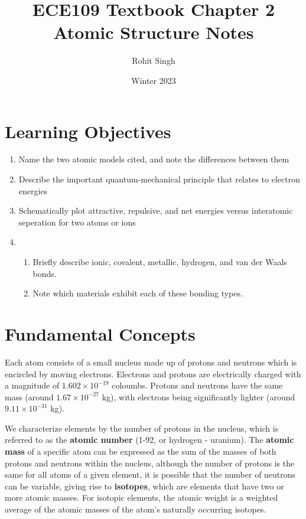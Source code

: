 \documentclass{article}
\title{ECE109 Textbook Chapter 2 Atomic Structure Notes}
\author{Rohit Singh}
\date{Winter 2023}
\begin{document}
\maketitle

\tableofcontents

\section{Learning Objectives}

\begin{enumerate}
    \item Name the two atomic models cited, and note the differences between them
    \item Describe the important quantum-mechanical principle that relates to electron energies
    \item Schematically plot attractive, repulsive, and net energies versus interatomic seperation for two atoms or ions
    \item \begin{enumerate}
        \item Briefly describe ionic, covalent, metallic, hydrogen, and van der Waals bonds.
        \item Note which materials exhibit each of these bonding types.
    \end{enumerate}
\end{enumerate}

\section{Fundamental Concepts}

Each atom consists of a small nucleus made up of protons and neutrons which is encircled by moving electrons. Electrons and protons are electrically charged with a magnitude of $1.602 \times 10^{-19}$ coloumbs. Protons and neutrons have the same mass (around $1.67 \times 10^{-27}$ kg), with electrons being significantly lighter (around $9.11 \times 10^{-31}$ kg).

We characterize elements by the number of protons in the nucleus, which is referred to as the \textbf{atomic number} (1-92, or hydrogen - uranium). The \textbf{atomic mass} of a specific atom can be expressed as the sum of the masses of both protons and neutrons within the nucleus, although the number of protons is the same for all atoms of a given element, it is possible that the number of neutrons can be variable, giving rise to \textbf{isotopes}, which are elements that have two or more atomic masses. For isotopic elements, the atomic weight is a weighted average of the atomic masses of the atom's naturally occurring isotopes.
\end{document}
